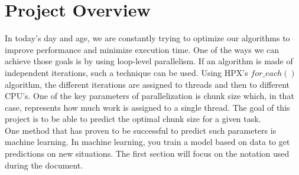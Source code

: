 \section*{Project Overview}
 In today's day and age, we are constantly trying to optimize our algorithms to improve performance and minimize execution time. One of the ways we can achieve those goals is by using loop-level parallelism. If an algorithm is made of independent iterations, such a technique can be used. Using HPX's $for\_each()$ algorithm, the different iterations are assigned to threads and then to different CPU's. One of the key parameters of parallelization is chunk size which, in that case, represents how much work is assigned to a single thread.
The goal of this project is to be able to predict the optimal chunk size for a given task. \\

One method that has proven to be successful to predict such parameters is machine learning. In machine learning, you train a model based on data to get predictions on new situations. The first section will focus on the notation used during the document.